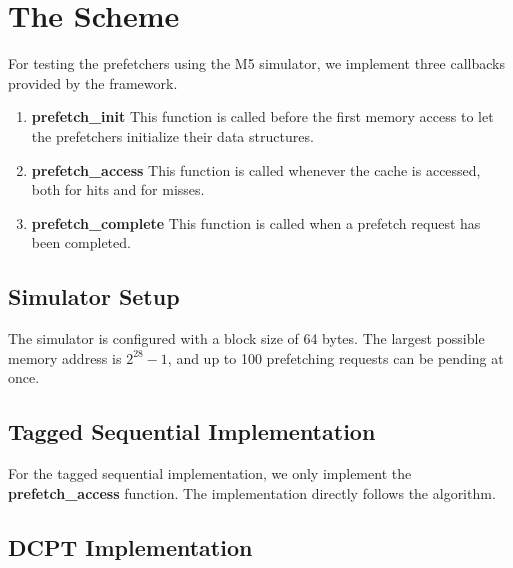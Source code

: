 \section{The Scheme}

For testing the prefetchers using the M5 simulator, we implement three callbacks
provided by the framework.

\begin{enumerate}
	\item \textbf{prefetch\_init}
		This function is called before the first memory access to let the
		prefetchers initialize their data structures.
	\item \textbf{prefetch\_access}
		This function is called whenever the cache is accessed, both for hits and
		for misses.
	\item \textbf{prefetch\_complete}
		This function is called when a prefetch request has been completed.
\end{enumerate}

\subsection{Simulator Setup}


The simulator is configured with a block size of 64 bytes. The largest possible
memory address is $2^{28}-1$, and up to 100 prefetching requests can be pending at
once.

\subsection{Tagged Sequential Implementation}


For the tagged sequential implementation, we only implement the
\textbf{prefetch\_access} function. The implementation directly follows the
algorithm.

\subsection{DCPT Implementation}

